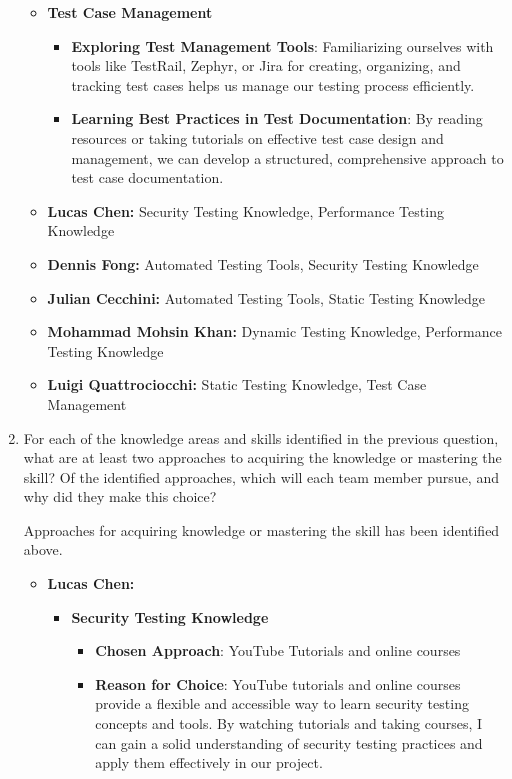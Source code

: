 \documentclass[12pt, titlepage]{article}
\begin{document}
\begin{enumerate}
\begin{itemize}
    \item \textbf{Test Case Management}
    \begin{itemize}
        \item \textbf{Exploring Test Management Tools}: Familiarizing ourselves with tools like TestRail, Zephyr, or Jira for creating, organizing, and tracking test cases helps us manage our testing process efficiently.
        \item \textbf{Learning Best Practices in Test Documentation}: By reading resources or taking tutorials on effective test case design and management, we can develop a structured, comprehensive approach to test case documentation.
    \end{itemize}

  \end{itemize}

  \begin{itemize}
    \item \textbf{Lucas Chen:} Security Testing Knowledge, Performance Testing Knowledge
    \item \textbf{Dennis Fong:} Automated Testing Tools, Security Testing Knowledge
    \item \textbf{Julian Cecchini:} Automated Testing Tools, Static Testing Knowledge
    \item \textbf{Mohammad Mohsin Khan:} Dynamic Testing Knowledge, Performance Testing Knowledge
    \item \textbf{Luigi Quattrociocchi:} Static Testing Knowledge, Test Case Management
  \end{itemize}


  \item For each of the knowledge areas and skills identified in the previous
  question, what are at least two approaches to acquiring the knowledge or
  mastering the skill?  Of the identified approaches, which will each team
  member pursue, and why did they make this choice?

  Approaches for acquiring knowledge or mastering the skill has been identified
  above.
  
  \begin{itemize}
    \item \textbf{Lucas Chen:} 
    \begin{itemize}
        \item \textbf{Security Testing Knowledge}  
        \begin{itemize}
            \item \textbf{Chosen Approach}: YouTube Tutorials and online courses
            \item \textbf{Reason for Choice}: YouTube tutorials and online courses provide a flexible and 
            accessible way to learn security testing concepts and tools. By watching tutorials and taking courses, 
            I can gain a solid understanding of security testing practices and apply them effectively in our project.
        \end{itemize}
    

\end{itemize}
\end{itemize}
\end{enumerate}
\end{document}
